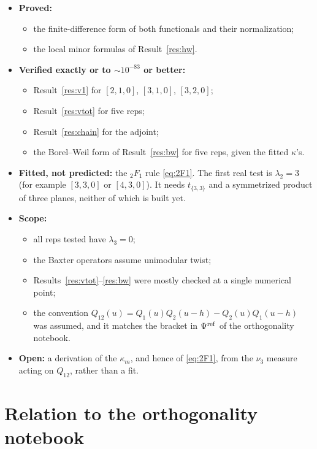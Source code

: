 \documentclass[11pt]{article}
\theoremstyle{definition}
\theoremstyle{remark}
\begin{document}
\begin{itemize}
\item \textbf{Proved:}
  \begin{itemize}
  \item the finite-difference form of both functionals and their normalization;
  \item the local minor formulas of Result~\ref{res:hw}.
  \end{itemize}
\item \textbf{Verified exactly or to ${\sim}10^{-83}$ or better:}
  \begin{itemize}
  \item Result~\ref{res:v1} for $[2,1,0]$, $[3,1,0]$, $[3,2,0]$;
  \item Result~\ref{res:vtot} for five reps;
  \item Result~\ref{res:chain} for the adjoint;
  \item the Borel--Weil form of Result~\ref{res:bw} for five reps, given the fitted $\kappa$'s.
  \end{itemize}
\item \textbf{Fitted, not predicted:} the ${}_2F_1$ rule \eqref{eq:2F1}. The first real test is $\lambda_2=3$ (for example $[3,3,0]$ or $[4,3,0]$). It needs $t_{\{3,3\}}$ and a symmetrized product of three planes, neither of which is built yet.
\item \textbf{Scope:}
  \begin{itemize}
  \item all reps tested have $\lambda_3=0$;
  \item the Baxter operators assume unimodular twist;
  \item Results~\ref{res:vtot}--\ref{res:bw} were mostly checked at a single numerical point;
  \item the convention $Q_{12}(u)=Q_1(u)Q_2(u-h)-Q_2(u)Q_1(u-h)$ was assumed, and it matches the bracket in $\Psi^{\rm ref}$ of the orthogonality notebook.
  \end{itemize}
\item \textbf{Open:} a derivation of the $\kappa_m$, and hence of \eqref{eq:2F1}, from the $\nu_3$ measure acting on $Q_{12}$, rather than a fit.
\end{itemize}

\section{Relation to the orthogonality notebook}
\end{document}

